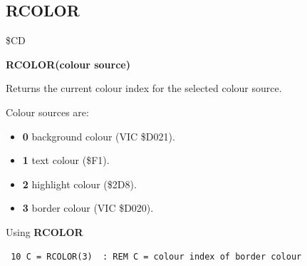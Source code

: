 
\newpage
\subsection{RCOLOR}
\begin{description}[leftmargin=2cm,style=nextline]
\item [Token:] \$CD
\item [Format:] {\bf RCOLOR(colour source)}
\item [Usage:]  Returns the current colour index for the
                selected colour source.

                Colour sources are:
                \begin{itemize}
                    \item {\bf 0} background colour (VIC \$D021).
                    \item {\bf 1} text colour (\$F1).
                    \item {\bf 2} highlight colour (\$2D8).
                    \item {\bf 3} border colour (VIC \$D020).
                \end{itemize}

\item [Example:] Using {\bf RCOLOR}

\begin{tcolorbox}[colback=black,coltext=white]
\verbatimfont{\codefont}
\begin{verbatim}
 10 C = RCOLOR(3)  : REM C = colour index of border colour
\end{verbatim}
\end{tcolorbox}
\end{description}


\newpage

